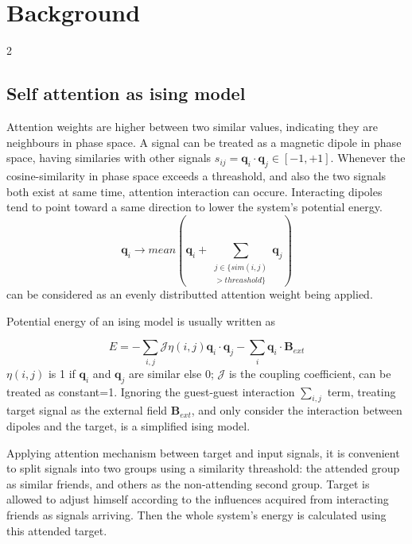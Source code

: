 \documentclass[11pt,a4paper]{article}
\begin{document}
\section{Background}

\begin{multicols} {2}
\subsection{Self attention as ising model}
Attention weights are higher between two similar values, indicating they are neighbours in phase space. A signal can be treated as a magnetic dipole in phase space, having similaries with other signals $s_{ij}=\boldsymbol{q}_i \cdot \boldsymbol{q}_j \in [-1, +1]$. 
Whenever the cosine-similarity in phase space exceeds a threashold, and also the two signals both exist at same time, attention interaction can occure. Interacting dipoles tend to point toward a same direction to lower the system's potential energy. 
$$
  \boldsymbol{q}_i \rightarrow mean(\boldsymbol{q}_i+\sum\limits_{ \begin{split} j \in \{sim(i,j) \\ 
  >threashold\} \end{split}} \boldsymbol{q}_j)
$$
can be considered as an evenly distributted attention weight being applied. 

Potential energy of an ising model is usually written as 

\begin{equation}
E=-\sum\limits_{i,j} \mathcal{J} \mathcal{\eta}(i,j) \boldsymbol{q}_i \cdot \boldsymbol{q}_j - \sum\limits_{i} \boldsymbol{q}_i \cdot \boldsymbol{B}_{ext}
\label{energy-ising}
\end{equation}
$\mathcal{\eta}(i,j)$ is 1 if $\boldsymbol{q}_i$ and $\boldsymbol{q}_j$ are similar else 0; $\mathcal{J}$ is the coupling coefficient, can be treated as constant=1. 
Ignoring the guest-guest interaction $\sum\limits_{i,j}$ term, treating target signal as the external field $\boldsymbol{B}_{ext}$, and only consider 
the interaction between dipoles and the target, is a simplified ising model. 

Applying attention mechanism between target and input signals, it is convenient to split signals into two groups using a similarity threashold:  
the attended group as similar friends, and others as the non-attending second group. Target is allowed to adjust himself according to the influences acquired from interacting friends as signals arriving. 
Then the whole system's energy is calculated using this attended target.


\end{multicols}
\end{document}
